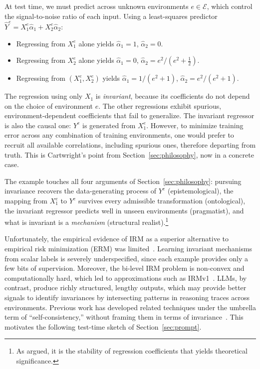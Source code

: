 At test time, we must predict across unknown environments $e \in \mathcal{E}$, which control the signal-to-noise ratio of each input. Using a least-squares predictor $\hat{Y}^e = X_1^e\hat{\alpha}_1  +  X_2^e\hat{\alpha}_2$:
\begin{itemize}
    \item Regressing from $X_1^e$ alone yields $\hat{\alpha}_1 = 1$, $\hat{\alpha}_2 = 0$.
    \item Regressing from $X_2^e$ alone yields $\hat{\alpha}_1 = 0$, $\hat{\alpha}_2 = e^2 / (e^2 + \frac{1}{2})$.
    \item Regressing from $(X_1^e, X_2^e)$ yields $\hat{\alpha}_1 = 1 / (e^2 + 1)$, $\hat{\alpha}_2 = e^2 / (e^2 + 1)$.
\end{itemize}
The regression using only $X_1$ is \emph{invariant}, because its coefficients do not depend on the choice of environment $e$. The other regressions exhibit spurious, environment-dependent coefficients that fail to generalize. The invariant regressor is also the causal one: $Y^e$ is generated from $X^e_1$. However, to minimize training error across any combination of training environments, one would prefer to recruit all available correlations, including spurious ones, therefore departing from truth. This is Cartwright's point from Section~\ref{sec:philosophy}, now in a concrete case.

The example touches all four arguments of Section~\ref{sec:philosophy}: pursuing invariance recovers the data-generating process of $Y^e$ (epistemological), the mapping from $X^e_1$ to $Y^e$ survives every admissible transformation (ontological), the invariant regressor predicts well in unseen environments (pragmatist), and what is invariant is a \emph{mechanism} (structural realist).\footnote{As \citet{tukey1954} argued, it is the stability of regression coefficients that yields theoretical significance.}

Unfortunately, the empirical evidence of IRM as a superior alternative to empirical risk minimization (ERM) was limited~\citep{rosenfeld2020risks, kamath2021does, gulrajani2020search}. Learning invariant mechanisms from scalar labels is severely underspecified, since each example provides only a few bits of supervision. Moreover, the bi-level IRM problem is non-convex and computationally hard, which led to approximations such as IRMv1~\citep{arjovsky2019}. LLMs, by contrast, produce richly structured, lengthy outputs, which may provide better signals to identify invariances by intersecting patterns in reasoning traces across environments. Previous work has developed related techniques under the umbrella term of ``self-consistency,'' without framing them in terms of invariance~\citep{wang2022selfconsistency, chen2023universal, manakul2023selfcheckgpt, elazar2021measuring, arora2022ask}. This motivates the following test-time sketch of Section~\ref{sec:prompt}.

